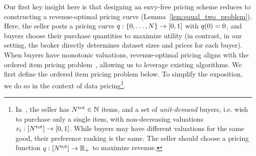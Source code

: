 Our first key insight here is that designing an envy-free pricing scheme reduces to constructing a revenue-optimal pricing curve (Lemma~\ref{lem:equal_two_problem}).
Here, the seller posts a pricing curve $q: \{0,\dots,N\} \to [0,1]$ with $q(0) = 0$, and buyers choose their purchase quantities to maximize utility  
(in contrast, in our setting, the broker directly determines dataset sizes and prices for each buyer).  
When buyers have monotonic valuations, revenue-optimal pricing aligns with the ordered item pricing problem~\citep{chawla2022pricing}, allowing us to leverage existing algorithms.  
We first define the ordered item pricing problem below.
To simplify the exposition, we do so in the context of data pricing\footnote{In~\citet{chawla2022pricing}, the seller has $N^{\rm tot} \in \mathbb{N}$ items, and a set of \emph{unit-demand} buyers, i.e. wish to purchase only a single item, with non-decreasing valuations $v_{i}: [N^{\rm tot}] \to [0,1]$. While buyers may have different valuations for the same good, their preference ranking is the same. The seller should choose a pricing function $q: [N^{\rm tot}] \to \mathbb{R}_+$ to maximize revenue.}.


